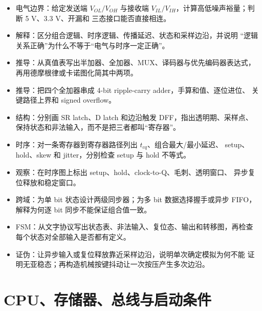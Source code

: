\begin{itemize}
  \item 电气边界：给定发送端 \(V_{OL}/V_{OH}\) 与接收端
        \(V_{IL}/V_{IH}\)，计算高低噪声裕量；判断 5 V、3.3 V、开漏和
        三态接口能否直接相连。
  \item 解释：区分组合逻辑、时序逻辑、传播延迟、状态和采样边沿，并说明
        “逻辑关系正确”为什么不等于“电气与时序一定正确”。
  \item 推导：从真值表写出半加器、全加器、MUX、译码器与优先编码器表达式，
        再用德摩根律或卡诺图化简其中两项。
  \item 推导：把四个全加器串成 4-bit ripple-carry adder，手算和值、逐位进位、
        关键路径上界和 signed overflow。
  \item 结构：分别画 SR latch、D latch 和边沿触发 DFF，指出透明期、采样点、
        保持状态和非法输入，而不是把三者都叫“寄存器”。
  \item 时序：对一条寄存器到寄存器路径列出 \(t_{cq}\)、组合最大/最小延迟、
        setup、hold、skew 和 jitter，分别检查 setup 与 hold 不等式。
  \item 观察：在时序图上标出 setup、hold、clock-to-Q、毛刺、透明窗口、
        异步复位释放和稳定窗口。
  \item 跨域：为单 bit 状态设计两级同步器；为多 bit 数据选择握手或异步 FIFO，
        解释为何逐 bit 同步不能保证组合值一致。
  \item FSM：从文字协议写出状态表、非法输入、复位态、输出和转移图，再检查
        每个状态对全部输入是否都有定义。
  \item 证伪：让异步输入或复位释放靠近采样边沿，说明单次确定模拟为何不能
        证明无亚稳态；再构造机械按键抖动让一次按压产生多次边沿。
\end{itemize}

\section*{CPU、存储器、总线与启动条件}

